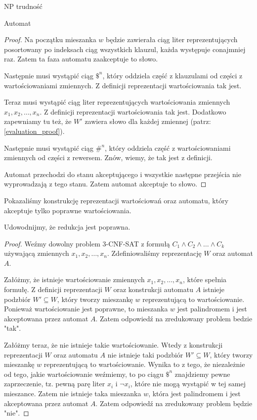\documentclass{article}
\theoremstyle{definition}
\theoremstyle{remark}
\begin{document}
\begin{section}{NP trudność}
\begin{subsection}{Automat}
\begin{proof}
         Na początku mieszanka $w$ będzie zawierała ciąg liter reprezentujących
         posortowany po indeksach ciąg wszystkich klauzul, każda występuje conajmniej
         raz. Zatem ta faza automatu zaakceptuje to słowo.

         Następnie musi wystąpić ciąg $ \$^n $, który oddziela część z klauzulami od
         części z wartościowaniami zmiennych. Z definicji reprezentacji wartościowania
         tak jest.

         Teraz musi wystąpić ciąg liter reprezentujących wartościowania zmiennych $x_1,
             x_2, \ldots, x_n$. Z definicji reprezentacji wartościowania tak jest. Dodatkowo
         zapewniamy tu też, że $W'$ zawiera słowo dla każdej zmiennej (patrz:
         \ref{evaluation_proof}).

         Następnie musi wystąpić ciąg $ \#^n $, który oddziela część z wartościowaniami
         zmiennych od części z rewersem. Znów, wiemy, że tak jest z definicji.

         Automat przechodzi do stanu akceptującego i wszystkie następne przejścia nie
         wyprowadzają z tego stanu. Zatem automat akceptuje to słowo.

     \end{proof}
 \end{subsection}

 Pokazaliśmy konstrukcję reprezentacji wartościowań oraz automatu, który
 akceptuje tylko poprawne wartościowania.

 Udowodnijmy, że redukcja jest poprawna.

 \begin{proof}

     Weźmy dowolny problem 3-CNF-SAT z formułą $C_1 \land C_2 \land \ldots \land
         C_k$ używającą zmiennych $x_1, x_2, \ldots, x_n$. Zdefiniowaliśmy reprezentację
     $W$ oraz automat $A$.

     Załóżmy, że istnieje wartościowanie zmiennych $x_1, x_2, \ldots, x_n$, które
     spełnia formułę. Z definicji reprezentacji $W$ oraz konstrukcji automatu $A$
     istnieje podzbiór $W' \subseteq W$, który tworzy mieszankę $w$ reprezentującą
     to wartościowanie. Ponieważ wartościowanie jest poprawne, to mieszanka $w$ jest
     palindromem i jest akceptowana przez automat $A$. Zatem odpowiedź na
     zredukowany problem bedzie "tak".

     Załóżmy teraz, że nie istnieje takie wartościowanie. Wtedy z konstrukcji
     reprezentacji $W$ oraz automatu $A$ nie istnieje taki podzbiór $W' \subseteq
         W$, który tworzy mieszankę $w$ reprezentującą to wartościowanie. Wynika to z
     tego, że niezależnie od tego, jakie wartościowanie weźmiemy, to po ciągu $ \$^n
     $ znajdziemy pewne zaprzeczenie, tz. pewną parę liter $ x_i $ i $ \neg x_i $,
     które nie mogą wystąpić w tej samej mieszance. Zatem nie istnieje taka
     mieszanka $w$, która jest palindromem i jest akceptowana przez automat $A$.
     Zatem odpowiedź na zredukowany problem będzie "nie".


\end{proof}
\end{section}
\end{document}
